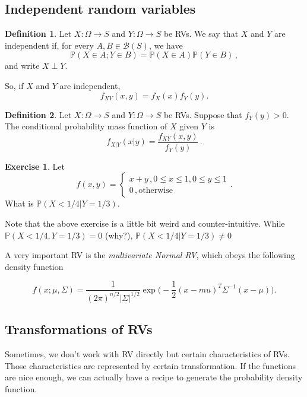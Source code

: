 \documentclass[
  openany]{book}
\theoremstyle{definition}
\newtheorem{definition}{Definition}[chapter]
\theoremstyle{definition}
\theoremstyle{definition}
\newtheorem{exercise}{Exercise}[chapter]
\theoremstyle{definition}
\theoremstyle{remark}
\begin{document}
\hypertarget{independent-random-variables}{%
\subsection{Independent random variables}\label{independent-random-variables}}

\begin{definition}
Let \(X:\Omega \to S\) and \(Y: \Omega \to S\) be RVs.
We say that \(X\) and \(Y\) are independent if,
for every \(A, B \in \mathcal{B}(S)\), we have
\[ \mathbb{P}( X \in A; Y \in B) = \mathbb{P}(X \in A) \mathbb{P}(Y \in B) \,, \]
and write \(X \perp Y\).
\end{definition}

So, if \(X\) and \(Y\) are independent,
\[f_{XY}(x,y) = f_X(x) f_Y(y).\]

\begin{definition}
Let \(X:\Omega \to S\) and \(Y: \Omega \to S\) be RVs.
Suppose that \(f_Y(y) >0\).
The conditional probability mass function of \(X\) given \(Y\) is
\[ f_{X|Y} (x|y) = \frac{f_{XY}(x,y)}{f_Y(y)} \,.\]
\end{definition}

\begin{exercise}
Let
\[ f(x,y) = \begin{cases} x+y \,, 0\leq x \leq 1, 0 \leq y \leq 1\\
            0\,, \text{otherwise} \end{cases}.\]
What is \(\mathbb{P}( X < 1/4 \vert Y = 1/3)\).
\end{exercise}

Note that the above exercise is a little bit weird and counter-intuitive.
While
\(\mathbb{P}( X < 1/4 , Y = 1/3) = 0\) (why?),
\(\mathbb{P}( X < 1/4 | Y = 1/3) \not= 0\)

A very important RV is the \emph{multivariate Normal RV}, which obeys the
following density function

\[f(x; \mu, \Sigma) = \frac{1}{(2\pi)^{n/2} | \Sigma |^{1/2}} \exp\big( -\frac{1}{2} (x-mu)^T \Sigma^{-1} (x-\mu)  \big).\]

\hypertarget{transformations-of-rvs}{%
\subsection{Transformations of RVs}\label{transformations-of-rvs}}

Sometimes, we don't work with RV directly but certain characteristics of RVs.
Those characteristics are represented by certain transformation.
If the functions are nice enough, we can actually have a recipe to generate
the probability density function.
\end{document}
